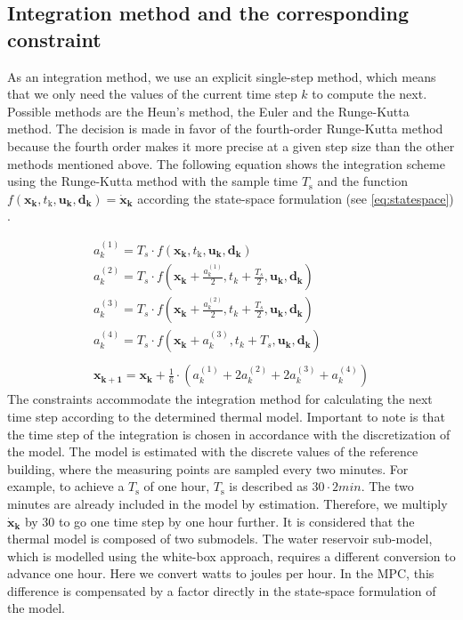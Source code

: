 \subsection{Integration method and the corresponding constraint}
\label{COnstaintIntegration}
As an integration method, we use an explicit single-step method, which means that we only need the values of the current time step $k$ to compute the next. Possible methods are the Heun's method, the Euler and the Runge-Kutta method. The decision is made in favor of the fourth-order Runge-Kutta method because the fourth order makes it more precise at a given step size than the other methods mentioned above. The following equation shows the integration scheme using the Runge-Kutta method with the sample time $T_\text{s}$ and the function $f(\mathbf{x_k},t_\text{k},\mathbf{u_k},\mathbf{d_k}) = \mathbf{\dot{x}_\text{k}}$ according the state-space formulation (see \autoref{eq:statespace}) \cite{KaiFurmansMarcusGeimerBalazsPritzCarstenProppe.WS1920}.

    \begin{align}
        \label{Runke-Kutta}
        a_k^{(1)} = T_s \cdot f(\mathbf{x_k},t_\text{k},\mathbf{u_k},\mathbf{d_k}) \\
        a_k^{(2)} = T_s \cdot f(\mathbf{x_k}+\frac{a_k^{(1)}}{2},t_k+\frac{T_s}{2},\mathbf{u_k},\mathbf{d_k})\nonumber\\
        a_k^{(3)} = T_s \cdot f(\mathbf{x_k}+\frac{a_k^{(2)}}{2},t_k+\frac{T_s}{2},\mathbf{u_k},\mathbf{d_k})\nonumber\\
        a_k^{(4)} = T_s \cdot f(\mathbf{x_k}+a_k^{(3)},t_k+T_s,\mathbf{u_k},\mathbf{d_k})\nonumber\\
        \nonumber\\
        \mathbf{x_{k+1}} = \mathbf{x_k} + \frac{1}{6}\cdot (a_k^{(1)} + 2 a_k^{(2)} + 2 a_k^{(3)} + a_k^{(4)})\nonumber
    \end{align}
The constraints accommodate the integration method for calculating the next time step according to the determined thermal model.
Important to note is that the time step of the integration is chosen in accordance with the discretization of the model. The model is estimated with the discrete values of the reference building, where the measuring points are sampled every two minutes. For example, to achieve a $T_\text{s}$ of one hour, $T_\text{s}$ is described as $30 \cdot 2 min$. The two minutes are already included in the model by estimation. Therefore, we multiply $\mathbf{\dot{x}_\text{k}}$ by 30 to go one time step by one hour further. It is considered that the thermal model is composed of two submodels. The water reservoir sub-model, which is modelled using the white-box approach, requires a different conversion to advance one hour. Here we convert watts to joules per hour. In the MPC, this difference is compensated by a factor directly in the state-space formulation of the model.

